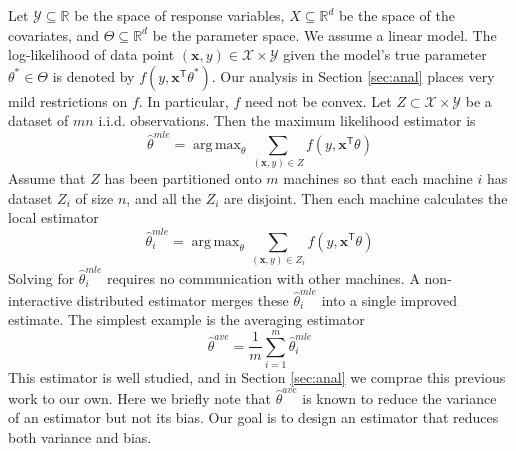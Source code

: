 \documentclass[twoside]{article}
\DeclareMathOperator*{\argmin}{arg\,min}
\DeclareMathOperator*{\argmax}{arg\,max}
\newcommand{\Q}{\mathcal{Q}}
\newcommand{\Y}{\mathcal{Y}}
\newcommand{\X}{\mathcal{X}}
\newcommand{\x}{\mathbf{x}}
\newcommand{\w}{\theta}
\newcommand{\wave}{\hat\w^{ave}}
\newcommand{\wmle}{\hat\w^{mle}}
\newcommand{\wstar}{{\w^{*}}}
\newcommand{\wq}{\hat\w^{q}}
\newcommand{\wqstar}{\hat\w^{q^*}}
\newcommand{\trans}[1]{\ensuremath{{#1}^{\mathsf{T}}}}
\newcommand{\ltwo}[1]{{\lVert {#1} \rVert}}
\begin{document}
Let $\Y\subseteq\mathbb{R}$ be the space of response variables,
$X\subseteq\mathbb{R}^d$ be the space of the covariates,
and $\Theta\subseteq\mathbb{R}^d$ be the parameter space.
We assume a linear model.
The log-likelihood of data point $(\x,y)\in\X\times\Y$ given the model's true parameter $\wstar\in\Theta$ is denoted by $f(y,\trans\x\wstar)$.
Our analysis in Section \ref{sec:anal} places very mild restrictions on $f$.
In particular, $f$ need not be convex.
Let $Z\subset\X\times\Y$ be a dataset of $mn$ i.i.d. observations.
Then the maximum likelihood estimator is
\begin{equation}
\wmle=\argmax_\w \sum_{(\x,y)\in Z} f(y,\trans\x\w)
\end{equation}
Assume that $Z$ has been partitioned onto $m$ machines so that each machine $i$ has dataset $Z_i$ of size $n$, and all the $Z_i$ are disjoint.
Then each machine calculates the local estimator
\begin{equation}
\wmle_i = \argmax_\w \sum_{(\x,y) \in Z_i} f(y,\trans\x\w)
\end{equation}
Solving for $\wmle_i$ requires no communication with other machines.
A non-interactive distributed estimator merges these $\wmle_i$ into a single improved estimate.
The simplest example is the averaging estimator
\begin{equation}
\wave = \frac{1}{m}\sum_{i=1}^m \wmle_i
\end{equation}
This estimator is well studied, and in Section \ref{sec:anal} we comprae this previous work to our own.
Here we briefly note that $\wave$ is known to reduce the variance of an estimator but not its bias.
Our goal is to design an estimator that reduces both variance and bias.

\end{document}
